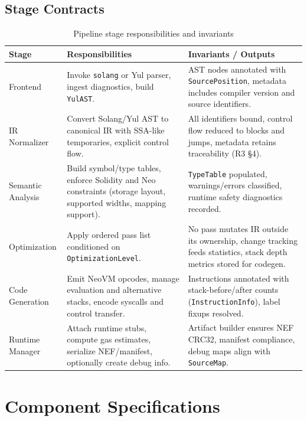 \documentclass[11pt]{article}
\begin{document}
\subsection{Stage Contracts}
\begin{table}[H]
\centering
\caption{Pipeline stage responsibilities and invariants}
\begin{tabularx}{\textwidth}{@{}p{}p{}X@{}}
\toprule
Stage & Responsibilities & Invariants / Outputs \\
\midrule
Frontend & Invoke \texttt{solang} or Yul parser, ingest diagnostics, build \texttt{YulAST}. & AST nodes annotated with \texttt{SourcePosition}, metadata includes compiler version and source identifiers.\\
IR Normalizer & Convert Solang/Yul AST to canonical IR with SSA-like temporaries, explicit control flow. & All identifiers bound, control flow reduced to blocks and jumps, metadata retains traceability (R3 \S4).\\
Semantic Analysis & Build symbol/type tables, enforce Solidity and Neo constraints (storage layout, supported widths, mapping support). & \texttt{TypeTable} populated, warnings/errors classified, runtime safety diagnostics recorded.\\
Optimization & Apply ordered pass list conditioned on \texttt{OptimizationLevel}. & No pass mutates IR outside its ownership, change tracking feeds statistics, stack depth metrics stored for codegen.\\
Code Generation & Emit NeoVM opcodes, manage evaluation and alternative stacks, encode syscalls and control transfer. & Instructions annotated with stack-before/after counts (\texttt{InstructionInfo}), label fixups resolved.\\
Runtime Manager & Attach runtime stubs, compute gas estimates, serialize NEF/manifest, optionally create debug info. & Artifact builder ensures NEF CRC32, manifest compliance, debug maps align with \texttt{SourceMap}.\\
\bottomrule
\end{tabularx}
\end{table}

\section{Component Specifications}
\end{document}
